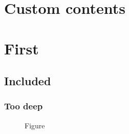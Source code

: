 \documentclass{book}
\begin{document}
\chapter*{Custom contents}
\makeatletter{}\makeatother
\tableofcontents
\chapter{First}\section{Included}\subsection{Too deep}
\begin{figure}\caption{Figure}\end{figure}
\begin{table}\caption{Table}\end{table}
\end{document}
